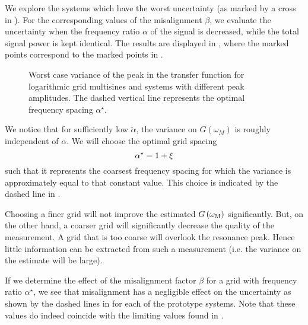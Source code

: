   We explore the systems which have the worst uncertainty (as marked by a cross in ).
  For the corresponding values of the misalignment $\beta$, we evaluate the uncertainty when the frequency ratio $\alpha$ of the signal is decreased, while the total signal power is kept identical.
  The results are displayed in , where the marked points correspond to the marked points in .
  
  \begin{figure}[ht]
    \centering
      \setlength\figureheight{5cm}
      \setlength{}
    
    \caption[Worst-case variance $\sigma_G^2\left( \wM \right)$ as a function of the frequency ratio $\alpha$.]{Worst case variance of the peak in the transfer function for logarithmic
             grid multisines and systems with different peak amplitudes.
             The dashed vertical line represents the optimal frequency spacing $\alpha^{\star}$.}
    \label{fig:worstCaseAlpha}
  \end{figure}

  We notice that for sufficiently low $\tilde{\alpha}$, the variance on $G\left( \omega_M \right)$ is roughly independent of $\alpha$.
  We will choose the optimal grid spacing
  \begin{equation}
    \alpha^{\star} = 1 + \xi
    \label{eq:optimAlpha}
  \end{equation}
  such that it represents the coarsest frequency spacing for which the variance is approximately equal to that constant value.
  This choice is indicated by the dashed line in .

  Choosing a finer grid will not improve the estimated $G\left( \omega_{\mathrm{M}} \right)$ significantly.
  But, on the other hand, a coarser grid will significantly decrease the quality of the measurement.
  A grid that is too coarse will overlook the resonance peak.
  Hence little information can be extracted from such a measurement (i.e. the variance on the estimate will be large).

  If we determine the effect of the misalignment factor $\beta$ for a grid with frequency ratio $\alpha^{\star}$, we see that misalignment has a negligible effect on the uncertainty as shown by the dashed lines in  for each of the prototype systems.
  Note that these values do indeed coincide with the limiting values found in .
  
